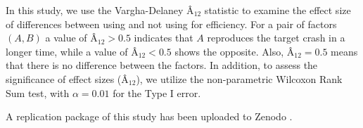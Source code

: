 In this study, we use the Vargha-Delaney \^A$_{12}$ statistic \cite{vargha} to examine the effect size of differences between using and not using \bbc for efficiency.
For a pair of factors $(A,B)$ a value of \^A$_{12} > 0.5$ indicates that $A$ reproduces the target crash in a longer time, while a value of \^A$_{12} < 0.5$ shows the opposite. Also, \^A$_{12}= 0.5$ means that there is no difference between the factors.
In addition, to assess the significance of effect sizes (\^A$_{12}$), we utilize the non-parametric Wilcoxon Rank Sum test, with $\alpha = 0.01$ for the Type I error.

A replication package of this study has been uploaded to Zenodo \cite{derakhshanfar_pouria_2020_3953519}.
